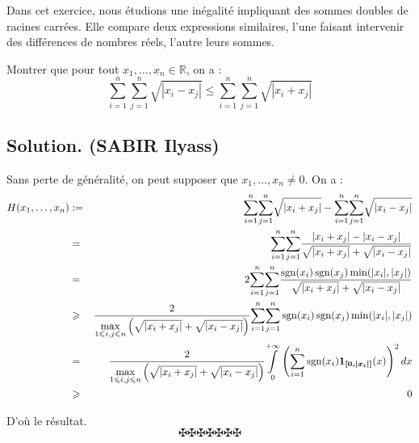 Dans cet exercice, nous {\'e}tudions une in{\'e}galit{\'e} impliquant des
sommes doubles de racines carr{\'e}es. Elle compare deux expressions
similaires, l'une faisant intervenir des diff{\'e}rences de nombres r{\'e}els,
l'autre leurs sommes.

\begin{exercise}[(IMO 2021)]
Montrer que pour tout $x_1, \ldots, x_n \in \mathbb{R}$, on a :
\[ \underset{i = 1}{\overset{n}{\sum}} \underset{j = 1}{\overset{n}{\sum}}
   \sqrt{| x_i - x_j |} \leqslant \underset{i = 1}{\overset{n}{\sum}}
   \underset{j = 1}{\overset{n}{\sum}} \sqrt{| x_i + x_j |} \]

\end{exercise}

\subsection*{Solution. (SABIR Ilyass)}


Sans perte de g{\'e}n{\'e}ralit{\'e}, on peut supposer que $x_1, \ldots, x_n
\neq 0$. On a :
\begin{eqnarray*}
  H (x_1, \ldots, x_n) & := & \underset{i = 1}{\overset{n}{\sum}}
  \underset{j = 1}{\overset{n}{\sum}} \sqrt{| x_i + x_j |} - \underset{i =
  1}{\overset{n}{\sum}} \underset{j = 1}{\overset{n}{\sum}} \sqrt{| x_i - x_j
  |}\\
  & = & \underset{i = 1}{\overset{n}{\sum}} \underset{j =
  1}{\overset{n}{\sum}} \frac{| x_i + x_j | - | x_i - x_j |}{\sqrt{| x_i + x_j
  |} + \sqrt{| x_i - x_j |}}\\
  & = & 2 \underset{i = 1}{\overset{n}{\sum}} \underset{j =
  1}{\overset{n}{\sum}} \frac{\operatorname{sgn} (x_i) \operatorname{sgn} (x_j) \min (| x_i |,
  | x_j |)}{\sqrt{| x_i + x_j |} + \sqrt{| x_i - x_j |}}\\
  & \geqslant & \frac{2}{\underset{1 \leqslant i, j \leqslant n}{\max} \left(
  \sqrt{| x_i + x_j |} + \sqrt{| x_i - x_j |} \right)} \underset{i =
  1}{\overset{n}{\sum}} \underset{j = 1}{\overset{n}{\sum}} \operatorname{sgn} (x_i)
  \operatorname{sgn} (x_j) \min (| x_i |, | x_j |)\\
  & = & \frac{2}{\underset{1 \leqslant i, j \leqslant n}{\max} \left( \sqrt{|
  x_i + x_j |} + \sqrt{| x_i - x_j |} \right)} \underset{0}{\overset{+
  \infty}{\int}} \left( \underset{i = 1}{\overset{n}{\sum}} \operatorname{sgn} (x_i)
  \boldsymbol{1_{[0, | x_i |]}} (x) \right)^2 d x\\
  & \geqslant & 0
\end{eqnarray*}


D'o{\`u} le r{\'e}sultat.
\[ \maltese \maltese \maltese \maltese \maltese \maltese \maltese \]
